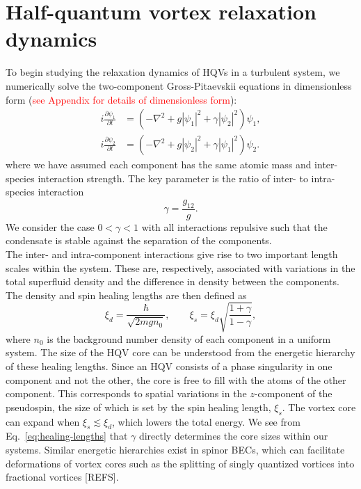 \section{Half-quantum vortex relaxation dynamics}
To begin studying the relaxation dynamics of HQVs in a turbulent system, we
numerically solve the two-component Gross-Pitaevskii equations in dimensionless
form
(\textcolor{red}{see Appendix for details of dimensionless form}):
\begin{equation}
    \begin{aligned}
        i\frac{\partial \psi_1}{\partial t} &= (-\nabla^2 + g|\psi_1|^2
        + \gamma|\psi_2|^2)\psi_1, \\
        i\frac{\partial \psi_2}{\partial t} &= (-\nabla^2 + g|\psi_2|^2
        + \gamma|\psi_1|^2)\psi_2.
    \end{aligned}
    \label{eq:dimensionless-two-comp-GPEs}
\end{equation}
where we have assumed each component has the same atomic mass and inter-species
interaction strength.
The key parameter is the ratio of inter- to intra-species interaction
\begin{equation}
    \gamma = \frac{g_{12}}{g}.
\end{equation}
We consider the case $0 < \gamma < 1$ with all interactions repulsive such that
the condensate is stable against the separation of the components. \\
The inter- and intra-component interactions give rise to two important length
scales within the system.
These are, respectively, associated with variations in the total superfluid
density and the difference in density between the components.
The density and spin healing lengths are then defined as~\cite{Eto2011}
\begin{equation}
    \xi_d = \frac{\hbar}{\sqrt{2mgn_0}}, \qquad 
    \xi_s = \xi_d \sqrt{\frac{1 + \gamma}{1 - \gamma}},
    \label{eq:healing-lengths}
\end{equation}
where $n_0$ is the background number density of each component in a uniform
system.
The size of the HQV core can be understood from the energetic hierarchy of
these healing lengths.
Since an HQV consists of a phase singularity in one component and not the other,
the core is free to fill with the atoms of the other component.
This corresponds to spatial variations in the $z$-component of the pseudospin,
the size of which is set by the spin healing length, $\xi_s$.
The vortex core can expand when $\xi_s \lesssim \xi_d$, which lowers
the total energy.
We see from Eq.~\eqref{eq:healing-lengths} that $\gamma$ directly determines
the core sizes within our systems.
Similar energetic hierarchies exist in spinor BECs, which can facilitate
deformations of vortex cores such as the splitting of singly quantized vortices
into fractional vortices [REFS].

